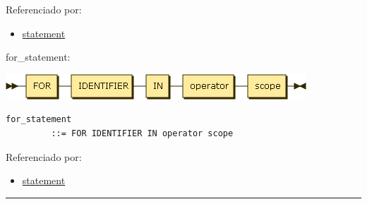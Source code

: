Referenciado por:

\begin{itemize}
\tightlist
\item
  \protect\hyperlink{statement}{statement}
\end{itemize}

\protect\hypertarget{for_statement}{}{for\_statement:}

\includegraphics[width=4.43750in,height=0.37500in]{diagram/for_statement.png}

\begin{verbatim}
for_statement
         ::= FOR IDENTIFIER IN operator scope
\end{verbatim}

Referenciado por:

\begin{itemize}
\tightlist
\item
  \protect\hyperlink{statement}{statement}
\end{itemize}

\begin{center}\rule{0.5\linewidth}{\linethickness}\end{center}
